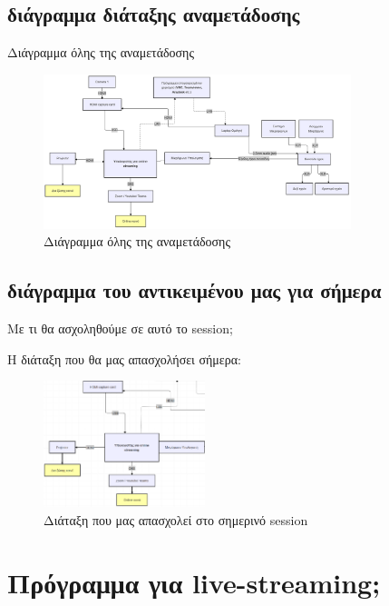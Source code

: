 \documentclass[aspectratio=169]{beamer}
\begin{document}
\subsection{διάγραμμα διάταξης αναμετάδοσης}
\begin{frame}{Διάγραμμα όλης της αναμετάδοσης}
  \begin{figure}
    \includegraphics[width=0.8\textwidth]{images/diagram.png}
    \caption{Διάγραμμα όλης της αναμετάδοσης}
    \label{fig:diagram}
  \end{figure}
\end{frame}
\subsection{διάγραμμα του αντικειμένου μας για σήμερα}
\begin{frame}{Με τι θα ασχοληθούμε σε αυτό το session;}
  \begin{block}{Η διάταξη που θα μας απασχολήσει σήμερα:}
    \begin{figure}
      \includegraphics[width=0.42\textwidth]{images/laptop.png}
      \caption{Διάταξη που μας απασχολεί στο σημερινό session}
      \label{fig:laptop}
    \end{figure}
  \end{block}
\end{frame}
\section{Πρόγραμμα για live-streaming;}
\end{document}
